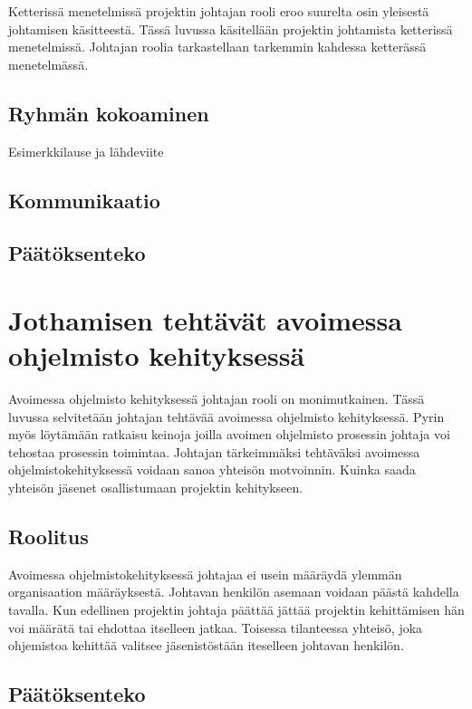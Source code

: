 \documentclass[finnish]{tktltiki2}
\theoremstyle{definition}
\theoremstyle{remark}
\begin{document}
Ketterissä menetelmissä projektin johtajan rooli eroo suurelta osin yleisestä johtamisen käsitteestä. Tässä luvussa käsitellään projektin johtamista ketterissä menetelmissä. Johtajan roolia tarkastellaan tarkemmin kahdessa ketterässä menetelmässä. 

\subsection{Ryhmän  kokoaminen}
Esimerkkilause ja lähdeviite~\cite{4755768}

\subsection{Kommunikaatio}

\subsection{Päätöksenteko}

\section{Jothamisen tehtävät avoimessa ohjelmisto kehityksessä}

Avoimessa ohjelmisto kehityksessä johtajan rooli on monimutkainen. Tässä luvussa selvitetään johtajan tehtävää avoimessa ohjelmisto kehityksessä. Pyrin myös löytämään ratkaisu keinoja joilla avoimen ohjelmisto prosessin johtaja voi tehostaa prosessin toimintaa. Johtajan tärkeimmäksi tehtäväksi avoimessa ohjelmistokehityksessä  voidaan sanoa yhteisön motvoinnin. Kuinka saada yhteisön jäsenet osallistumaan projektin kehitykseen.~\cite{Li:2006:MOS:1125170.1125182}

\subsection{Roolitus}

Avoimessa ohjelmistokehityksessä johtajaa ei usein määräydä ylemmän organisaation määräyksestä. Johtavan henkilön asemaan voidaan päästä kahdella tavalla. Kun edellinen projektin johtaja päättää jättää projektin kehittämisen hän voi määrätä tai ehdottaa itselleen jatkaa. Toisessa tilanteessa yhteisö, joka ohjemistoa kehittää valitsee jäsenistöstään iteselleen johtavan henkilön. ~\cite{Li:2006:MOS:1125170.1125182}

\subsection{Päätöksenteko}
\end{document}
